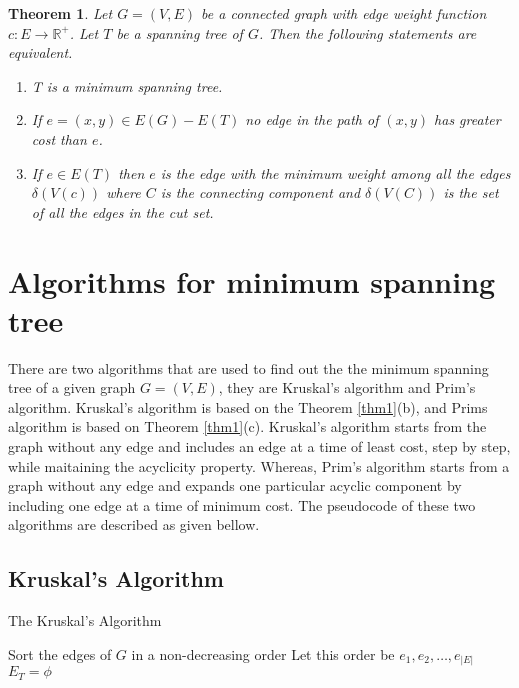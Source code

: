 \documentclass[12pt]{article}
\newtheorem{theorem}{Theorem}
\theoremstyle{plain}
\begin{document}
\begin{theorem} \label{MST-pro}
Let $G=(V, E)$ be a connected graph with edge weight function $c:E \rightarrow \mathbb{R}^+$. Let $T$ be a spanning tree of $G$. Then  the following statements are equivalent.
\begin{enumerate}
\item[(a)] T is a minimum spanning tree.
\item[(b)] If $e=(x,y) \in E(G) - E(T) $ no edge in the path of $(x,y)$ has greater cost than $e$.
\item[(c)] If  $e \in E(T)$ then
 $e$ is the edge with the minimum weight among all the edges $\delta (V(c))$ where $C$ is the connecting component and $\delta (V(C))$ is the set of all the edges in the cut set.
\end{enumerate}
\end{theorem}

\section*{Algorithms for minimum spanning tree}
There are two algorithms that are used to find out the the minimum spanning tree  of a given graph $G=(V,E)$,
they are Kruskal's algorithm and Prim's algorithm. Kruskal's algorithm is based on the Theorem \ref{thm1}(b), 
and Prims algorithm is based on Theorem \ref{thm1}(c).  Kruskal's algorithm starts from the graph without 
any edge and includes  an edge at a time of least cost, step by step, while maitaining the acyclicity 
property. Whereas, Prim's algorithm starts from a graph without any edge and expands one particular 
acyclic component by including one edge at a time of minimum cost. The pseudocode of these two algorithms are 
described as given bellow.

\subsection*{Kruskal's Algorithm}
\noindent
\begin{minipage}{1.\linewidth}
\begin{algorithm2e}[H]
\caption{The Kruskal's Algorithm}
\label{alg: Kruskal's Algorithm}
\vspace{.1cm}
Sort the edges of $G$ in a non-decreasing order\; \vspace{.1cm}
Let this order be $e_1, e_2, \ldots, e_{|E|}$\; \vspace{.1cm}
$E_T=\phi$\;
\end{algorithm2e}
\end{minipage}
\end{document}
